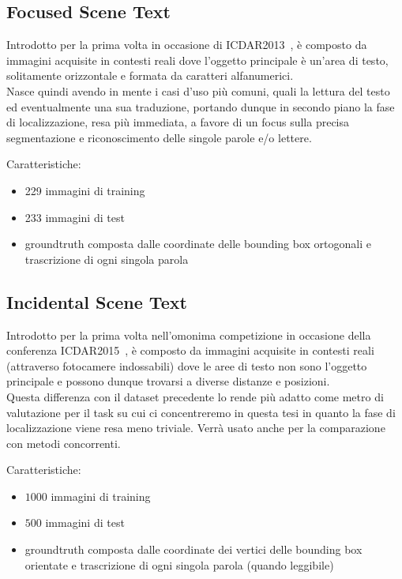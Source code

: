 \subsection{Focused Scene Text}
\label{subsec:focused}
Introdotto per la prima volta in occasione di ICDAR2013~\cite{ICDAR2013}, è composto da immagini acquisite in contesti reali dove l'oggetto principale è un'area di testo, solitamente orizzontale e formata da caratteri alfanumerici.\\
Nasce quindi avendo in mente i casi d'uso più comuni, quali la lettura del testo ed eventualmente una sua traduzione, portando dunque in secondo piano la fase di localizzazione, resa più immediata, a favore di un focus sulla precisa segmentazione e riconoscimento delle singole parole e/o lettere.\par
Caratteristiche:
\begin{itemize}
	\item
		229 immagini di training
	\item
		233 immagini di test
	\item
		groundtruth composta dalle coordinate delle bounding box ortogonali e trascrizione di ogni singola parola
\end{itemize}

\subsection{Incidental Scene Text}
\label{subsec:incidental}
Introdotto per la prima volta nell'omonima competizione in occasione della conferenza ICDAR2015~\cite{ICDAR2015}, è composto da immagini acquisite in contesti reali (attraverso fotocamere indossabili) dove le aree di testo non sono l'oggetto principale e possono dunque trovarsi a diverse distanze e posizioni.\\
Questa differenza con il dataset precedente lo rende più adatto come metro di valutazione per il task su cui ci concentreremo in questa tesi in quanto la fase di localizzazione viene resa meno triviale. Verrà usato anche per la comparazione con metodi concorrenti.\par
Caratteristiche:
\begin{itemize}
	\item
		$1000$ immagini di training
	\item
		$500$ immagini di test
	\item
		groundtruth composta dalle coordinate dei vertici delle bounding box orientate e trascrizione di ogni singola parola (quando leggibile)
\end{itemize}


